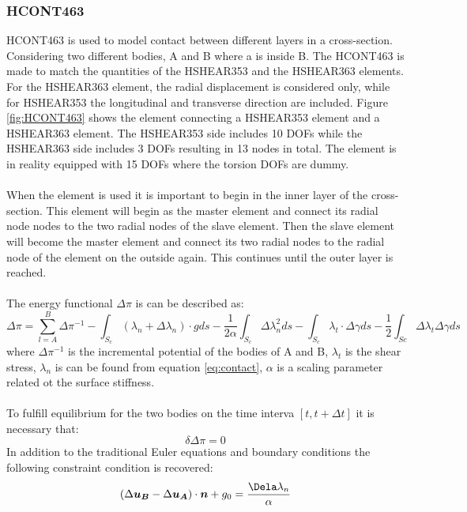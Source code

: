 \subsubsection{HCONT463}
HCONT463 is used to model contact between different layers in a cross-section.  Considering two different bodies, A and B where a is inside B. The HCONT463 is made to match the quantities of the HSHEAR353 and the HSHEAR363 elements. For the HSHEAR363 element, the radial displacement is considered only, while for HSHEAR353 the longitudinal and transverse direction are included. Figure \ref{fig:HCONT463} shows the element connecting a HSHEAR353 element and a HSHEAR363 element. The HSHEAR353 side includes 10 DOFs while the HSHEAR363 side includes 3 DOFs resulting in 13 nodes in total. The element is in reality equipped with 15 DOFs where the torsion DOFs are dummy.\\\\ When the element is used it is important to begin in the inner layer of the cross-section. This element will begin as the master element and connect its radial node nodes to the two radial nodes of the slave element. Then the slave element will become the master element and connect its two radial nodes to the radial node of the element on the outside again. This continues until the outer layer is reached.\\\\The energy functional $\Delta \pi$ is can be described as:
\begin{equation}
    \Delta \pi = \sum_{l=A}^B \Delta \pi^{-1} - \int_{S_c} (\lambda_n + \Delta \lambda_n) \cdot gds - \frac{1}{2 \alpha} \int_{S_c} \Delta \lambda_n^2 ds - \int_{S_c} \lambda_t \cdot \Delta \gamma ds - \frac{1}{2} \int_{Sc} \Delta \lambda_t \Delta \gamma ds
    \label{eq:energy}
\end{equation}
where $\Delta \pi^{-1}$ is the incremental potential of the bodies of A and B, $\lambda_t$ is the shear stress, $\lambda_n$ is can be found from equation \ref{eq:contact}, $\alpha$ is a scaling parameter related ot the surface stiffness. \\\\ To fulfill equilibrium for the two bodies on the time interva $[t,t+\Delta t]$ it is necessary that:
\begin{equation}
    \delta \Delta \pi =0
\end{equation}
In addition to the traditional Euler equations and boundary conditions the following constraint condition is recovered: 
\begin{equation}
    (\Delta \boldsymbol{u_B} - \Delta \boldsymbol{u_A}) \cdot \boldsymbol{n} + g_0=\frac{\Dela \lambda_n}{\alpha}
    \label{eq:contact}
\end{equation}
